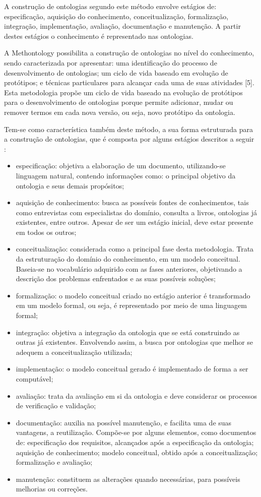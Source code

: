 A construção de ontologias segundo este método envolve estágios de: especificação, aquisição do conhecimento, conceitualização, formalização, integração, implementação, avaliação, documentação e manutenção. A partir destes estágios o conhecimento é representado nas ontologias.	

A Methontology possibilita a construção de ontologias no nível do conhecimento, sendo caracterizada por apresentar: uma identificação do processo de desenvolvimento de ontologias; um ciclo de vida baseado em evolução de protótipos; e técnicas particulares para alcançar cada uma de suas atividades [5]. Esta metodologia propõe um ciclo de vida baseado na evolução de protótipos para o desenvolvimento de ontologias porque permite adicionar, mudar ou remover termos em cada nova versão, ou seja, novo protótipo da ontologia.

Tem-se como característica também deste método, a sua forma estruturada para a construção de ontologias, que é composta por alguns estágios descritos a seguir \cite{mariano}:

\begin{itemize}
\item especificação: objetiva a elaboração de um documento, utilizando-se linguagem natural, contendo informações como: o principal objetivo da ontologia e seus demais propósitos;
\item aquisição de conhecimento: busca as possíveis fontes de conhecimentos, tais como entrevistas com especialistas do domínio, consulta a livros, ontologias já existentes, entre outros. Apesar de ser um estágio inicial, deve estar presente em todos os outros;
\item conceitualização: considerada como a principal fase desta metodologia. Trata da estruturação do domínio do conhecimento, em um modelo conceitual. Baseia-se no vocabulário adquirido com as fases anteriores, objetivando a descrição dos problemas enfrentados e as suas possíveis soluções;
\item formalização: o modelo conceitual criado no estágio anterior é transformado em um modelo formal, ou seja, é representado por meio de uma linguagem formal;
\item integração: objetiva a integração da ontologia que se está construindo as outras já existentes. Envolvendo assim, a busca por ontologias que melhor se adequem a conceitualização utilizada;
\item implementação: o modelo conceitual gerado é implementado de forma a ser computável;
\item avaliação: trata da avaliação em si da ontologia e deve considerar os processos de verificação e validação;
\item documentação: auxilia na possível manutenção, e facilita uma de suas vantagens, a reutilização. Compõe-se por alguns elementos, como documentos de: especificação dos requisitos, alcançados após a especificação da ontologia; aquisição de conhecimento; modelo conceitual, obtido após a conceitualização; formalização e avaliação;
\item manutenção: constituem as alterações quando necessárias, para possíveis melhorias ou correções.
\end{itemize}

